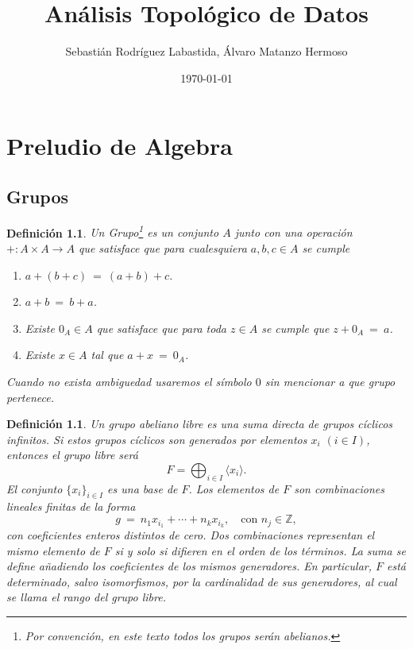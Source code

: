 \documentclass[12pt]{book}
\theoremstyle{plain}
\numberwithin{equation}{section} %
\newtheorem{definition}[thm]{Definición}
\begin{document}
\author{Sebastián Rodríguez Labastida, Álvaro Matanzo Hermoso}
\title{Análisis Topológico de Datos}
\date{\today}
\frontmatter
\maketitle

\chapter{Preludio de Algebra}
\section{Grupos}
\begin{definition}\label{def:grupo}
Un \textit{Grupo}\footnote{Por convención, en este texto todos los grupos serán abelianos.} es un conjunto $A$ junto con una operación $+\colon A\times A\rightarrow A$ que satisface que para cualesquiera $a,b,c \in A$ se cumple
\begin{enumerate}
	\item $a+(b+c) \ =\ (a+b)+c$.
	\item $a+b \ =\ b+a $.
	\item Existe $0_A \in A$ que satisface que para toda $z\in A$ se cumple que $z+0_A \ =\ a$.
	\item Existe $x\in A$ tal que $a+x \ =\ 0_A$.
\end{enumerate}
Cuando no exista ambiguedad usaremos el símbolo $0$ sin mencionar a que grupo pertenece.
\end{definition}


\begin{definition}\label{def:free-abelian-group}
Un \textit{grupo abeliano libre} es una suma directa de grupos cíclicos infinitos.
Si estos grupos cíclicos son generados por elementos $x_i$ $(i \in I)$, entonces
el grupo libre será
\[
F = \bigoplus_{i \in I} \langle x_i \rangle.
\]
El conjunto $\{x_i\}_{i \in I}$ es una base de $F$. Los elementos de $F$ son
combinaciones lineales finitas de la forma
\[
g \ =\ n_1x_{i_1} + \cdots + n_kx_{i_k}, \quad \text{con } n_j \in \mathbb{Z},
\]
con coeficientes enteros distintos de cero. Dos combinaciones representan el
mismo elemento de $F$ si y solo si difieren en el orden de los términos.
La suma se define añadiendo los coeficientes de los mismos generadores.
En particular, $F$ está determinado, salvo isomorfismos, por la cardinalidad
de sus generadores, al cual se llama el \textit{rango} del grupo libre.
\end{definition}
\end{document}
